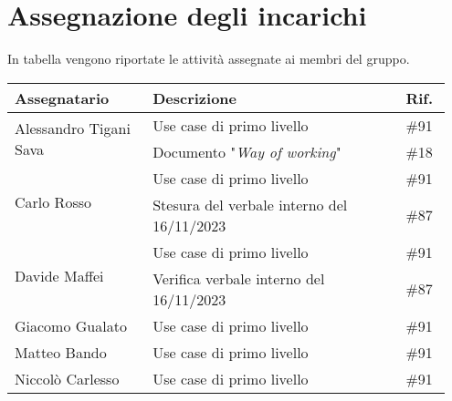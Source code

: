\section{Assegnazione degli incarichi}
In tabella vengono riportate le attività assegnate ai membri del gruppo.
\begin{center}
	{
		\renewcommand{\arraystretch}{1.5}
		\begin{tabular}{p{0.30\linewidth}|p{0.55\linewidth}|p{0.10\linewidth}}
			\textbf{Assegnatario}                   & \textbf{Descrizione}                       & \textbf{Rif.} \\
			\hline
			\multirow{2}{*}{Alessandro Tigani Sava} & Use case di primo livello                  & \#91          \\
			\cline{2-3}
			                                        & Documento "\textit{Way of working}"        & \#18          \\
			\hline
			\multirow{2}{*}{Carlo Rosso}            & Use case di primo livello                  & \#91          \\
			\cline{2-3}
			                                        & Stesura del verbale interno del 16/11/2023 & \#87          \\
			\hline
			\multirow{2}{*}{Davide Maffei}          & Use case di primo livello                  & \#91          \\
			\cline{2-3}
			                                        & Verifica verbale interno del 16/11/2023    & \#87          \\
			\hline
			Giacomo Gualato                         & Use case di primo livello                  & \#91          \\
			\hline
			Matteo Bando                            & Use case di primo livello                  & \#91          \\
			\hline
			Niccolò Carlesso                        & Use case di primo livello                  & \#91          \\
			\hline
		\end{tabular}
	}
\end{center}

